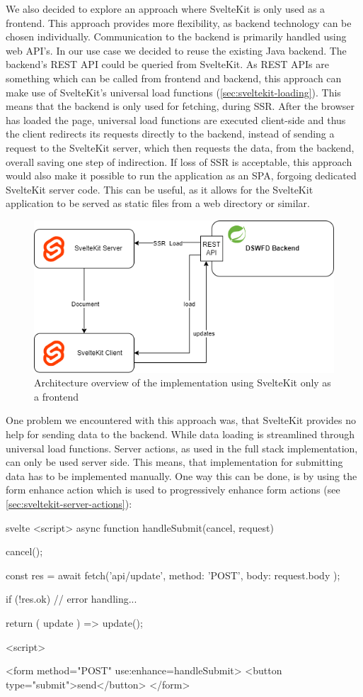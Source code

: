 We also decided to explore an approach where SvelteKit is only used as a frontend. This approach provides more flexibility, as backend technology can be chosen individually. Communication to the backend is primarily handled using web API's. In our use case we decided to reuse the existing Java backend. The backend's REST API could be queried from SvelteKit. As REST APIs are something which can be called from frontend and backend, this approach can make use of SvelteKit's universal load functions (\ref{sec:sveltekit-loading}). This means that the backend is only used for fetching, during SSR. After the browser has loaded the page, universal load functions are executed client-side and thus the client redirects its requests directly to the backend, instead of sending  a request to the SvelteKit server, which then requests the data, from the backend, overall saving one step of indirection. If loss of SSR is acceptable, this approach would also make it possible to run the application as an SPA, forgoing dedicated SvelteKit server code. This can be useful, as it allows for the SvelteKit application to be served as static files from a web directory or similar. 

\begin{figure}[ht]
    \centering
    \includegraphics[width=.6\linewidth]{assets/fe-only-client-takes-over}
    \caption{Architecture overview of the implementation using SvelteKit only as a frontend}
    \label{fig:dswfd-architecture-fe-only}
\end{figure}

One problem we encountered with this approach was, that SvelteKit provides no help for sending data to the backend. While data loading is streamlined through universal load functions. Server actions, as used in the full stack implementation, can only be used server side. This means, that implementation for submitting data has to be implemented manually. One way this can be done, is by using the form enhance action which is used to progressively enhance form actions (see \ref{sec:sveltekit-server-actions}):

\begin{myminted}{svelte}{}
<script>
    async function handleSubmit({cancel, request}) {
        cancel();

        const res = await fetch('api/update', {
            method: 'POST',
            body: request.body
        });

        if (!res.ok) {
            // error handling...
        }

        return ({ update }) => {
            update();
        }
    }
<script>

<form method="POST" use:enhance={handleSubmit}>
    <button type="submit">send</button>
</form>
\end{myminted}

